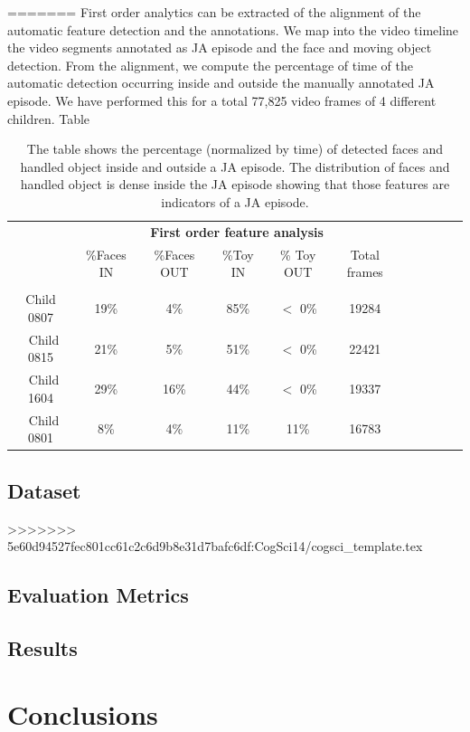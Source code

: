 \documentclass[10pt,letterpaper]{article}
\begin{document}
=======
First order analytics can be extracted of the alignment of the automatic feature detection and the annotations. We map into the video timeline the video segments annotated as JA episode and the face and moving object detection. From the alignment, we compute the percentage of time of the automatic detection occurring inside and outside the manually annotated JA episode. We have performed this for a total 77,825 video frames of 4 different children.  Table 
\begin{table}
\centering
\begin{tabular}{|c|c|c|c|c|c|c|c|c|c|c|}
\cline{2-6}
\multicolumn{1}{c}{} & \multicolumn{5}{c}{{\bf First order feature analysis}} 
\\
\cline{2-6}
\multicolumn{1}{c|}{} &\%Faces IN & \%Faces OUT & \%Toy IN & \% Toy OUT & Total frames\\
\hline\\[-1.2em]\hline
Child 0807 &  19\%        & 4\%    &  85\%  &  $<$ 0\%& 19284\\
\hline\
Child 0815 &   21\%       & 5\%    &  51\%   &$<$ 0\%& 22421\\
\hline\
Child 1604 &   29\%       & 16\%  &  44\%   & $<$ 0\%  & 19337\\
\hline\
Child 0801 &   8\%         &  4\%   &  11\%   & 11\%  & 16783\\
\hline
\end{tabular}
\caption{The table shows the percentage (normalized by time) of detected faces and handled object inside and outside a JA episode. The distribution of faces and handled object is dense inside the JA episode showing that those features are indicators of a JA episode.}
\label{tb:Results2}
\end{table}


\subsection{Dataset}
>>>>>>> 5e60d94527fec801cc61c2c6d9b8e31d7bafc6df:CogSci14/cogsci_template.tex
\subsection{Evaluation Metrics}
\subsection{Results}

\section{Conclusions}



\setlength{\bibleftmargin}{.125in}
\setlength{\bibindent}{-\bibleftmargin}


\end{document}
